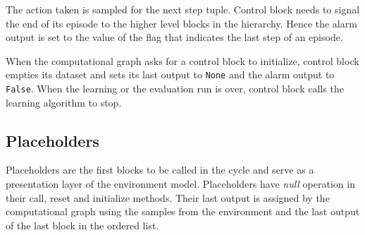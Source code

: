The action taken is sampled for the next step tuple. Control block needs to signal the end of its episode to the higher level blocks in the hierarchy. Hence the alarm output is set to the value of the flag that indicates the last step of an episode.

When the computational graph asks for a control block to initialize, control block empties its dataset and sets its last output to \texttt{None} and the alarm output to \texttt{False}. When the learning or the evaluation run is over, control block calls the learning algorithm to stop.

\subsection{Placeholders}
Placeholders are the first blocks to be called in the cycle and serve as a presentation layer of the environment model. Placeholders have \textit{null} operation in their call, reset and initialize methods. Their last output is assigned by the computational graph using the samples from the environment and the last output of the last block in the ordered list.

